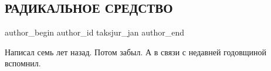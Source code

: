  
 
 
 
 
 
\subsection{РАДИКАЛЬНОЕ СРЕДСТВО}
\label{sec:24_11_2021.fb.taksjur_jan.1.radikalnoje_sredstvo}
 
\ifcmt
 author_begin
   author_id taksjur_jan
 author_end
\fi

Написал семь лет назад. Потом забыл. А в связи с недавней годовщиной вспомнил.


